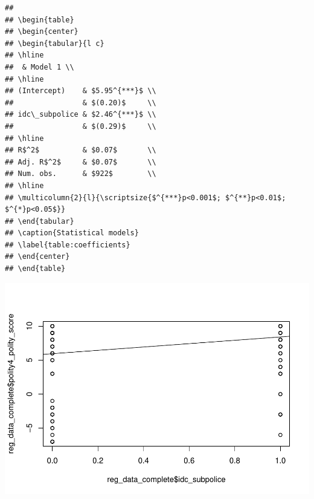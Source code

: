 \documentclass[
]{article}
\newenvironment{Shaded}{\begin{snugshade}}{\end{snugshade}}
\newcommand{\DataTypeTok}[1]{\textcolor[rgb]{0.13,0.29,0.53}{#1}}
\newcommand{\KeywordTok}[1]{\textcolor[rgb]{0.13,0.29,0.53}{\textbf{#1}}}
\newcommand{\NormalTok}[1]{#1}
\newcommand{\OperatorTok}[1]{\textcolor[rgb]{0.81,0.36,0.00}{\textbf{#1}}}
\begin{document}
\begin{verbatim}
## 
## \begin{table}
## \begin{center}
## \begin{tabular}{l c}
## \hline
##  & Model 1 \\
## \hline
## (Intercept)    & $5.95^{***}$ \\
##                & $(0.20)$     \\
## idc\_subpolice & $2.46^{***}$ \\
##                & $(0.29)$     \\
## \hline
## R$^2$          & $0.07$       \\
## Adj. R$^2$     & $0.07$       \\
## Num. obs.      & $922$        \\
## \hline
## \multicolumn{2}{l}{\scriptsize{$^{***}p<0.001$; $^{**}p<0.01$; $^{*}p<0.05$}}
## \end{tabular}
## \caption{Statistical models}
## \label{table:coefficients}
## \end{center}
## \end{table}
\end{verbatim}

\begin{Shaded}
\end{Shaded}

\includegraphics{05_tjbrailey_summary_statistics_files/figure-latex/unnamed-chunk-4-4.pdf}
\end{document}
